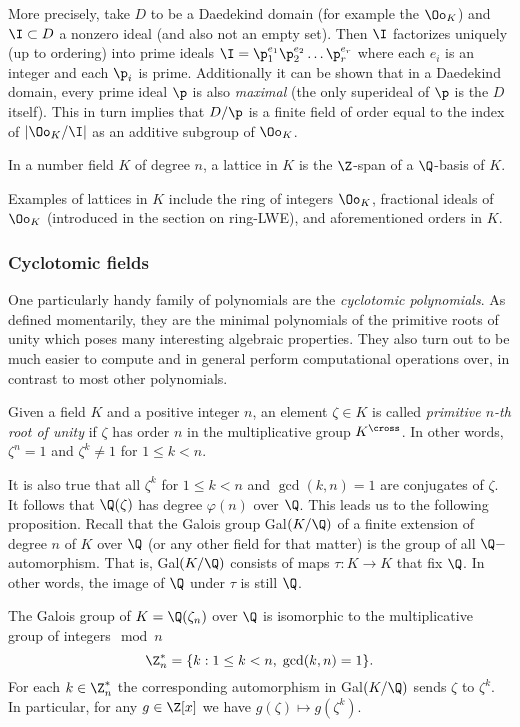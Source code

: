 More precisely, take $D$ to be a Daedekind domain (for example the $\Oo_K$) and $\I \subset D$ a nonzero ideal (and also not an empty set). Then $\I$ factorizes uniquely (up to ordering) into prime ideals $\I = \p_1^{e_1} \p_2^{e_2} \ldots \p_r^{e_r}$ where each $e_i$ is an integer and each $\p_i$ is prime. Additionally it can be shown that in a Daedekind domain, every prime ideal $\p$ is also \textit{maximal} (the only superideal of $\p$ is the $D$ itself). This in turn implies that $D/\p$ is a finite field of order equal to the index of $|\Oo_K /\I|$ as an additive subgroup of $\Oo_K$.

\begin{definition}
	In a number field $K$ of degree $n$, a lattice in $K$ is the $\Z$-span of a $\Q$-basis of $K$.
\end{definition}
Examples of lattices in $K$ include the ring of integers $\Oo_K$, fractional ideals of $\Oo_K$ (introduced in the section on ring-LWE), and aforementioned orders in $K$.

\subsubsection*{Cyclotomic fields}
One particularly handy family of polynomials are the \textit{cyclotomic polynomials}. As defined momentarily, they are the minimal polynomials of the primitive roots of unity which poses many interesting algebraic properties. They also turn out to be much easier to compute and in general perform computational operations over, in contrast to most other polynomials.

\begin{definition}\label{r-of-1}
    Given a field $K$ and a positive integer $n$, an element $\zeta \in K$ is called \textit{primitive $n$-th root of unity} if $\zeta$ has order $n$ in the multiplicative group $K^{\cross}$. In other words, $\zeta^n = 1$ and $\zeta^k \neq 1$ for $1 \leq k < n$. 
\end{definition}
It is also true that all $\zeta^k$ for $1 \leq k < n$ and $\gcd(k,n) = 1$ are conjugates of $\zeta$. It follows that $\Q(\zeta)$ has degree $\varphi(n)$ over $\Q$. This leads us to the following proposition. Recall that the Galois group Gal$(K/\Q)$ of a finite extension of degree $n$ of $K$ over $\Q$ (or any other field for that matter) is the group of all $\Q-$automorphism. That is, Gal$(K/\Q)$ consists of maps $\tau : K \rightarrow K$ that fix $\Q$. In other words, the image of $\Q$ under $\tau$ is still $\Q$. 
\begin{proposition}\label{galois}
	The Galois group of $K = \Q(\zeta_n)$ over $\Q$ is isomorphic to the multiplicative group of integers$\mod n$
	\[ \Z_n^* = \{ k : 1 \leq k < n, \; \gcd(k,n) = 1 \}. \]
	For each $k \in \Z_n^*$ the corresponding automorphism in Gal$(K/\Q)$ sends $\zeta$ to $\zeta^k$. In particular, for any $g \in \Z[x]$ we have $g(\zeta) \mapsto g(\zeta^k)$.
\end{proposition}

